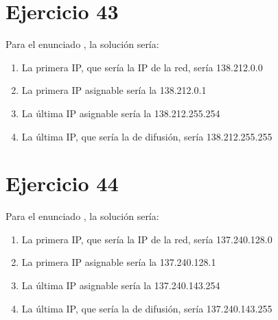 \documentclass[letterpaper,10pt,spanish]{sphinxmanual}
\begin{document}
\section{Ejercicio 43}
\label{\detokenize{t2_integracion_elementos/ejercicios_subredes_ipv4/rangos_direcciones:id43}}
\sphinxAtStartPar
Para el enunciado , la solución sería:
\begin{enumerate}
%
\item {} 
\sphinxAtStartPar
La primera IP, que sería la IP de la red, sería 138.212.0.0

\item {} 
\sphinxAtStartPar
La primera IP asignable sería la 138.212.0.1

\item {} 
\sphinxAtStartPar
La última IP asignable sería la 138.212.255.254

\item {} 
\sphinxAtStartPar
La última IP, que sería la de difusión, sería 138.212.255.255

\end{enumerate}


\section{Ejercicio 44}
\label{\detokenize{t2_integracion_elementos/ejercicios_subredes_ipv4/rangos_direcciones:id44}}
\sphinxAtStartPar
Para el enunciado , la solución sería:
\begin{enumerate}
%
\item {} 
\sphinxAtStartPar
La primera IP, que sería la IP de la red, sería 137.240.128.0

\item {} 
\sphinxAtStartPar
La primera IP asignable sería la 137.240.128.1

\item {} 
\sphinxAtStartPar
La última IP asignable sería la 137.240.143.254

\item {} 
\sphinxAtStartPar
La última IP, que sería la de difusión, sería 137.240.143.255

\end{enumerate}
\end{document}
